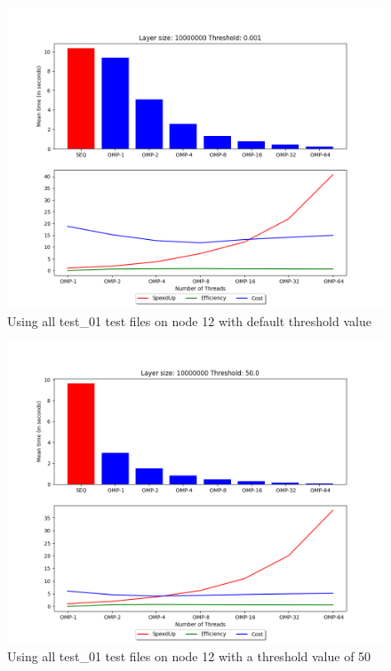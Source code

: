 \begin{figure}[h]
    \centering
    \includegraphics[scale=0.35]{images/plot_node12_all_test_01_ls_10000000.png}
    \caption{Using all test\_01 test files on node 12 with default threshold value}
    \label{fig:my_label}
\end{figure}
\begin{figure}[h]
    \centering
    \includegraphics[scale=0.35]{images/plot_node12_all_test_01_ls_10000000_h_50.png}
    \caption{Using all test\_01 test files on node 12 with a threshold value of 50}
    \label{fig:my_label}
\end{figure}

